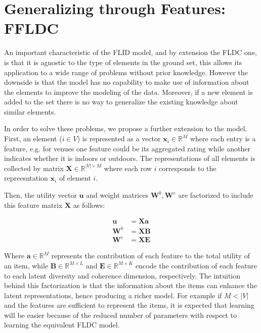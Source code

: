 \section{Generalizing through Features: FFLDC}

An important characteristic of the FLID model, and by extension the FLDC one, is that it is agnostic to the type of elements in the ground set, this allows its application to a wide range of problems without prior knowledge. However the downside is that the model has no capability to make use of information about the elements to improve the modeling of the data. Moreover, if a new element is added to the set there is no way to generalize the existing knowledge about similar elements.

In order to solve these problems, we propose a further extension to the model. First, an element ($i \in V$) is represented as a vector $\mathbf{x}_{i} \in \mathbb{R}^{M}$ where each entry is a feature, e.g. for venues one feature could be its aggregated rating while another indicates whether it is indoors or outdoors. The representations of all elements is collected by matrix $\mathbf{X} \in \mathbb{R}^{|V| \times M}$ where each row $i$ corresponds to the repreesntation $\mathbf{x}_{i}$ of element $i$.

Then, the utility vector $\mathbf{u}$ and weight matrices $\mathbf{W}^{b}, \mathbf{W}^{e}$ are factorized to include this feature matrix $\mathbf{X}$ as follows:

\begin{align}
  \mathbf{u} &= \mathbf{Xa}   \label{eq:ffldc-factorization-1} \\
  \mathbf{W}^{b} &= \mathbf{XB}  \label{eq:ffldc-factorization-2} \\
  \mathbf{W}^{e} &= \mathbf{XE}
  \label{eq:ffldc-factorization-3}
\end{align} 

Where $\mathbf{a} \in \mathbb{R}^{M}$ represents the contribution of each feature to the total utility of an item, while $\mathbf{B} \in \mathbb{R}^{M \times L}$ and $\mathbf{E} \in \mathbb{R}^{M \times K}$ encode the contribution of each feature to each latent diversity and coherence dimension, respectively. The intuition behind this factorization is that the information about the items can enhance the latent representations, hence producing a richer model. For example if $M < |V|$ and the features are sufficient to represent the items, it is expected that learning will be easier because of the reduced number of parameters with respect to learning the equivalent FLDC model.

